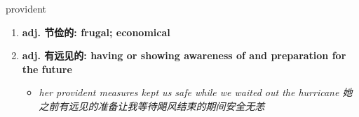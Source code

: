 
\begin{frame}
{\huge provident}
\begin{center}
\begin{enumerate}\Large
  \item \textbf{adj. 节俭的: frugal; economical}
  \item \textbf{adj. 有远见的: having or showing awareness of and preparation for the future}
  \begin{itemize}
    \item \em{\Large{her provident measures kept us safe while we waited out the hurricane 她之前有远见的准备让我等待飓风结束的期间安全无恙}}
  \end{itemize}
\end{enumerate}
\end{center}
\end{frame}
